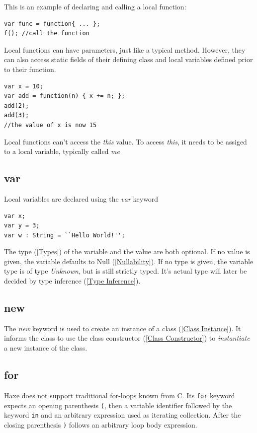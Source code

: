 \documentclass{article}
\newcommand{\expr}[1]{\texttt{#1}}
\newcommand{\tref}[2]{#1 (\ref{#2})}
\newcommand{\haxe}[2][]{%
}
\begin{document}
This is an example of declaring and calling a local function:
\begin{lstlisting}
var func = function{ ... };
f(); //call the function
\end{lstlisting}

Local functions can have parameters, just like a typical method.  However, they can also access static fields of their defining class and local variables defined prior to their function.

\begin{lstlisting}
var x = 10;
var add = function(n) { x += n; };
add(2);
add(3);
//the value of x is now 15
\end{lstlisting}

Local functions can't access the \emph{this} value.  To access \emph{this}, it needs to be assiged to a local variable, typically called \emph{me}

\haxe{assets/LocalFunction.hx}



\subsection{var}
\label{var}

Local variables are declared using the \emph{var} keyword
\begin{lstlisting}
var x;
var y = 3;
var w : String = ``Hello World!'';
\end{lstlisting}

The \tref{type}{Types} of the variable and the value are both optional.  If no value is given, the variable defaults to \tref{Null}{Nullability}.  If no type is given, the variable type is of type \emph{Unknown}, but is still strictly typed. It's actual type will later be decided by \tref{type inference}{Type Inference}.
\subsection{new}
\label{new}

The \emph{new} keyword is used to create an instance of a \tref{class}{Class Instance}.  It informs the class to use the \tref{class constructor}{Class Constructor} to \emph{instantiate} a new instance of the class. 

\subsection{for}

Haxe does not support traditional for-loops known from C. Its \expr{for} keyword expects an opening parenthesis \expr{(}, then a variable identifier followed by the keyword \expr{in} and an arbitrary expression used as iterating collection. After the closing parenthesis \expr{)} follows an arbitrary loop body expression.
\end{document}
